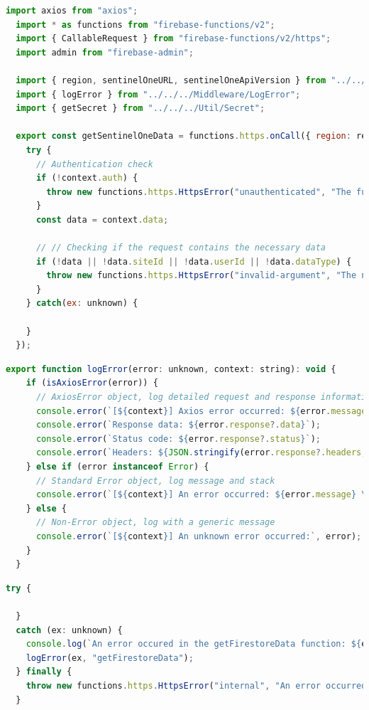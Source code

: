 \begin{lstlisting}[language=JavaScript, caption={onCall Cloud Function version 2.0, where the parameters of the function is less and 
  the way it handles the authorization is different}]
  import axios from "axios";
  import * as functions from "firebase-functions/v2";
  import { CallableRequest } from "firebase-functions/v2/https";
  import admin from "firebase-admin";

  import { region, sentinelOneURL, sentinelOneApiVersion } from "../../../config";
  import { logError } from "../../../Middleware/LogError";
  import { getSecret } from "../../../Util/Secret";

  export const getSentinelOneData = functions.https.onCall({ region: region }, async (context: CallableRequest<any>) => {
    try {
      // Authentication check
      if (!context.auth) {
        throw new functions.https.HttpsError("unauthenticated", "The function must be called while authenticated.");
      }
      const data = context.data;
  
      // // Checking if the request contains the necessary data
      if (!data || !data.siteId || !data.userId || !data.dataType) {
        throw new functions.https.HttpsError("invalid-argument", "The necessary requirement(s) are missing or invalid in your request.");
      }  
    } catch(ex: unknown) {

    }
  });
\end{lstlisting}

\begin{lstlisting}[language=JavaScript, caption=LogError functionality in the Utilities folder]
  export function logError(error: unknown, context: string): void {
    if (isAxiosError(error)) {
      // AxiosError object, log detailed request and response information
      console.error(`[${context}] Axios error occurred: ${error.message}`);
      console.error(`Response data: ${error.response?.data}`);
      console.error(`Status code: ${error.response?.status}`);
      console.error(`Headers: ${JSON.stringify(error.response?.headers, null, 2)}`);
    } else if (error instanceof Error) {
      // Standard Error object, log message and stack
      console.error(`[${context}] An error occurred: ${error.message} \n Stack: ${error.stack}`);
    } else {
      // Non-Error object, log with a generic message
      console.error(`[${context}] An unknown error occurred:`, error);
    }
  }
\end{lstlisting}


\begin{lstlisting}[language=JavaScript, caption={An example of how that utility is used in the Cloud Function, the reason why exception 
  type is unknown is to comply with the ESLint rules that does not recommend to use the any type to the variables}]
  try {

  }
  catch (ex: unknown) {
    console.log(`An error occured in the getFirestoreData function: ${ex}`);
    logError(ex, "getFirestoreData");
  } finally {
    throw new functions.https.HttpsError("internal", "An error occurred while getting the data in Firestore.");
  }
\end{lstlisting}

